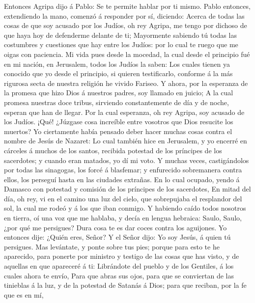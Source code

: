  Entonces Agripa dijo á Pablo: Se te permite hablar por ti
mismo. Pablo entonces, extendiendo la mano, comenzó á responder por sí,
diciendo:  Acerca de todas las cosas de que soy acusado por
los Judíos, oh rey Agripa, me tengo por dichoso de que haya hoy de
defenderme delante de ti;  Mayormente sabiendo tú todas las
costumbres y cuestiones que hay entre los Judíos: por lo cual te ruego
que me oigas con paciencia.  Mi vida pues desde la mocedad,
la cual desde el principio fué en mi nación, en Jerusalem, todos los
Judíos la saben:  Los cuales tienen ya conocido que yo desde
el principio, si quieren testificarlo, conforme á la más rigurosa secta
de nuestra religión he vivido Fariseo.  Y ahora, por la
esperanza de la promesa que hizo Dios á nuestros padres, soy llamado en
juicio;  A la cual promesa nuestras doce tribus, sirviendo
constantemente de día y de noche, esperan que han de llegar. Por la cual
esperanza, oh rey Agripa, soy acusado de los Judíos.  ¡Qué!
¿Júzgase cosa increíble entre vosotros que Dios resucite los muertos?
 Yo ciertamente había pensado deber hacer muchas cosas
contra el nombre de Jesús de Nazaret:  Lo cual también hice
en Jerusalem, y yo encerré en cárceles á muchos de los santos, recibida
potestad de los príncipes de los sacerdotes; y cuando eran matados, yo
dí mi voto.  Y muchas veces, castigándolos por todas las
sinagogas, los forcé á blasfemar; y enfurecido sobremanera contra ellos,
los perseguí hasta en las ciudades extrañas.  En lo cual
ocupado, yendo á Damasco con potestad y comisión de los príncipes de los
sacerdotes,  En mitad del día, oh rey, vi en el camino una
luz del cielo, que sobrepujaba el resplandor del sol, la cual me rodeó y
á los que iban conmigo.  Y habiendo caído todos nosotros en
tierra, oí una voz que me hablaba, y decía en lengua hebraica: Saulo,
Saulo, ¿por qué me persigues? Dura cosa te es dar coces contra los
aguijones.  Yo entonces dije: ¿Quién eres, Señor? Y el
Señor dijo: Yo soy Jesús, á quien tú persigues.  Mas
levántate, y ponte sobre tus pies; porque para esto te he aparecido,
para ponerte por ministro y testigo de las cosas que has visto, y de
aquellas en que apareceré á ti:  Librándote del pueblo y de
los Gentiles, á los cuales ahora te envío,  Para que abras
sus ojos, para que se conviertan de las tinieblas á la luz, y de la
potestad de Satanás á Dios; para que reciban, por la fe que es en mí,
